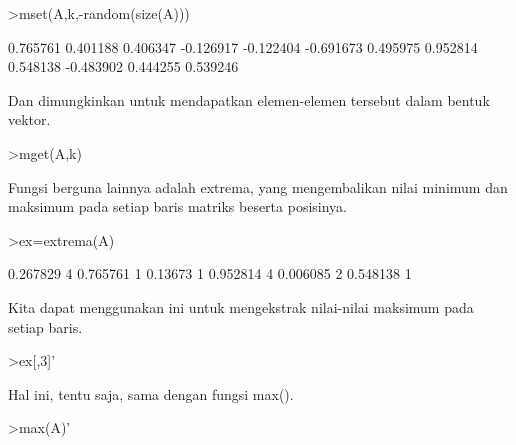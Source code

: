 \documentclass{article}
\newenvironment{eulernotebook}{\par}{\par}
\newenvironment{eulercomment}{\par\medskip}{\par\medskip}
\begin{document}
\begin{eulernotebook}
\begin{eulercomment}
\begin{eulercomment}
\begin{eulercomment}
\begin{eulercomment}
\begin{eulercomment}
\end{eulercomment}
\begin{eulerprompt}
>mset(A,k,-random(size(A)))
\end{eulerprompt}
\begin{euleroutput}
       0.765761      0.401188      0.406347     -0.126917 
      -0.122404     -0.691673      0.495975      0.952814 
       0.548138     -0.483902      0.444255      0.539246 
\end{euleroutput}
\begin{eulercomment}
Dan dimungkinkan untuk mendapatkan elemen-elemen tersebut dalam bentuk
vektor.
\end{eulercomment}
\begin{eulerprompt}
>mget(A,k)
\end{eulerprompt}
\begin{euleroutput}
  [0.267829,  0.13673,  0.390567,  0.006085]
\end{euleroutput}
\begin{eulercomment}
Fungsi berguna lainnya adalah extrema, yang mengembalikan nilai
minimum dan maksimum pada setiap baris matriks beserta posisinya.
\end{eulercomment}
\begin{eulerprompt}
>ex=extrema(A)
\end{eulerprompt}
\begin{euleroutput}
       0.267829             4      0.765761             1 
        0.13673             1      0.952814             4 
       0.006085             2      0.548138             1 
\end{euleroutput}
\begin{eulercomment}
Kita dapat menggunakan ini untuk mengekstrak nilai-nilai maksimum pada
setiap baris.
\end{eulercomment}
\begin{eulerprompt}
>ex[,3]'
\end{eulerprompt}
\begin{euleroutput}
  [0.765761,  0.952814,  0.548138]
\end{euleroutput}
\begin{eulercomment}
Hal ini, tentu saja, sama dengan fungsi max().
\end{eulercomment}
\begin{eulerprompt}
>max(A)'
\end{eulerprompt}
\begin{euleroutput}
  [0.765761,  0.952814,  0.548138]
\end{euleroutput}

\end{eulercomment}
\end{eulercomment}
\end{eulercomment}
\end{eulercomment}
\end{eulernotebook}
\end{document}
